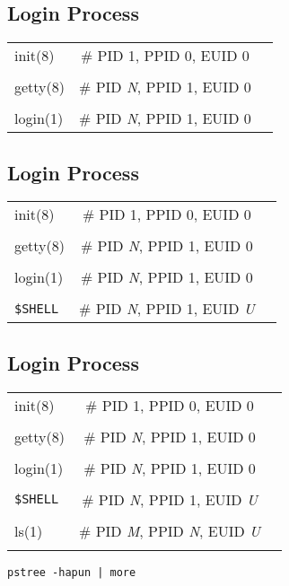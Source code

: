 \documentclass[xga]{xdvislides}
\begin{document}
\subsection{Login Process}
\vspace*{\fill}
\begin{center}
\begin{tabular}[width=.75\texwidth]{l c l}
init(8) & \# PID 1, PPID 0, EUID 0\\
\\
getty(8) & \# PID {\em N}, PPID 1, EUID 0\\
\\
login(1) & \# PID {\em N}, PPID 1, EUID 0\\
\end{tabular}
\vspace*{\fill}
\end{center}

\subsection{Login Process}
\vspace*{\fill}
\begin{center}
\begin{tabular}[width=.75\texwidth]{l c l}
init(8) & \# PID 1, PPID 0, EUID 0\\
\\
getty(8) & \# PID {\em N}, PPID 1, EUID 0\\
\\
login(1) & \# PID {\em N}, PPID 1, EUID 0\\
\\
\verb+$SHELL+ & \# PID {\em N}, PPID 1, EUID {\em U}\\
\end{tabular}
\vspace*{\fill}
\end{center}

\subsection{Login Process}
\vspace*{\fill}
\begin{center}
\begin{tabular}[width=.75\texwidth]{l c l}
init(8) & \# PID 1, PPID 0, EUID 0\\
\\
getty(8) & \# PID {\em N}, PPID 1, EUID 0\\
\\
login(1) & \# PID {\em N}, PPID 1, EUID 0\\
\\
\verb+$SHELL+ & \# PID {\em N}, PPID 1, EUID {\em U}\\
\\
ls(1) & \# PID {\em M}, PPID {\em N}, EUID {\em U}\\
\\
\end{tabular}
\vspace*{\fill}
\end{center}
\begin{center}
\verb+pstree -hapun | more+
\end{center}
\end{document}
